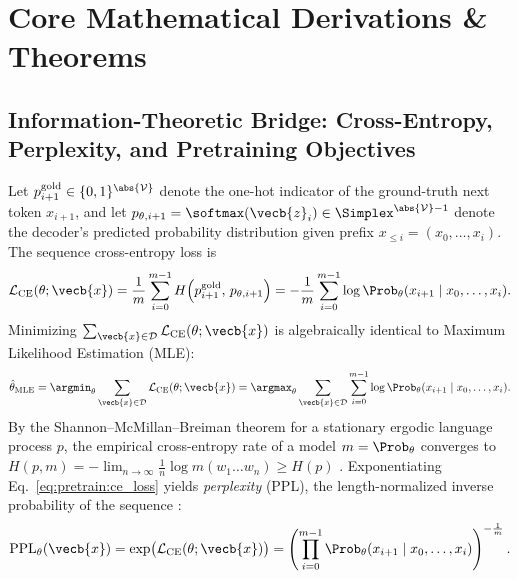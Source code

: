 \documentclass[../../../../master.tex]{subfiles}
\begin{document}
\section{Core Mathematical Derivations \& Theorems}
\label{sec:pretrain:derivations}

\subsection{Information-Theoretic Bridge: Cross-Entropy, Perplexity, and Pretraining Objectives}
\label{sec:pretrain:objectives}

\begin{coremath}
Let $p^{\text{gold}}_{i+1} \in \{0,1\}^{\abs{\mathcal{V}}}$ denote the one-hot indicator of the ground-truth next token $x_{i+1}$, and let $p_{\theta, i+1} = \softmax(\vecb{z}_{i}) \in \Simplex^{\abs{\mathcal{V}}-1}$ denote the decoder's predicted probability distribution given prefix $x_{\le i} = (x_0, \dots, x_i)$. The sequence cross-entropy loss is  
\begin{equation}
  \mathcal{L}_{\text{CE}}(\theta; \vecb{x})
  = \frac{1}{m}\sum_{i=0}^{m-1} H\!\left(p^{\text{gold}}_{i+1},\, p_{\theta, i+1}\right)
  = -\frac{1}{m}\sum_{i=0}^{m-1} \log \Prob_\theta(x_{i+1} \mid x_0, \dots, x_i).
  \label{eq:pretrain:ce_loss}
\end{equation}
Minimizing $\sum_{\vecb{x}\in\mathcal{D}} \mathcal{L}_{\text{CE}}(\theta; \vecb{x})$ is algebraically identical to Maximum Likelihood Estimation (MLE):
\begin{equation}
  \hat{\theta}_{\text{MLE}}
  = \argmin_\theta \sum_{\vecb{x}\in\mathcal{D}} \mathcal{L}_{\text{CE}}(\theta; \vecb{x})
  = \argmax_\theta \sum_{\vecb{x}\in\mathcal{D}} \sum_{i=0}^{m-1} \log \Prob_\theta(x_{i+1} \mid x_0, \dots, x_i).
  \label{eq:pretrain:mle}
\end{equation}
By the Shannon--McMillan--Breiman theorem for a stationary ergodic language process $p$, the empirical cross-entropy rate of a model $m = \Prob_\theta$ converges to $H(p, m) = -\lim_{n\to\infty} \frac{1}{n}\log m(w_1\dots w_n) \ge H(p)$ . Exponentiating Eq.~\eqref{eq:pretrain:ce_loss} yields \emph{perplexity} (PPL), the length-normalized inverse probability of the sequence  :
\begin{equation}
  \text{PPL}_\theta(\vecb{x})
  = \exp\!\big(\mathcal{L}_{\text{CE}}(\theta; \vecb{x})\big)
  = \left(\prod_{i=0}^{m-1} \Prob_\theta(x_{i+1} \mid x_0, \dots, x_i)\right)^{-\frac{1}{m}}.
  \label{eq:pretrain:ppl}
\end{equation}
\end{coremath}
\end{document}
